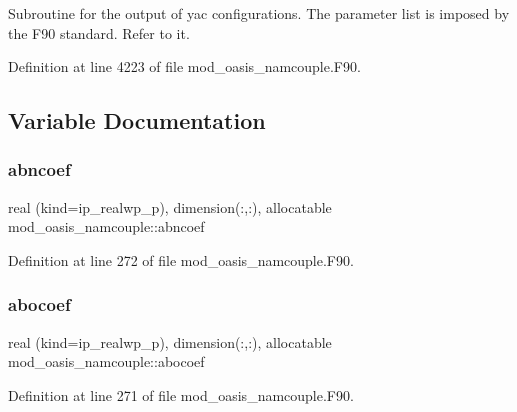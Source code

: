 Subroutine for the output of yac configurations. The parameter list is imposed by the F90 standard. Refer to it. 



Definition at line 4223 of file mod\+\_\+oasis\+\_\+namcouple.\+F90.



\subsection{Variable Documentation}
\mbox{\label{namespacemod__oasis__namcouple_a211c98282b89859bee6da0ef60f0d484}} 
\subsubsection{\texorpdfstring{abncoef}{abncoef}}
{\footnotesize\ttfamily real (kind=ip\+\_\+realwp\+\_\+p), dimension(\+:,\+:), allocatable mod\+\_\+oasis\+\_\+namcouple\+::abncoef\hspace{0.3cm}{\ttfamily [private]}}



Definition at line 272 of file mod\+\_\+oasis\+\_\+namcouple.\+F90.

\mbox{\label{namespacemod__oasis__namcouple_a1b3f80e8e19f950b806636caadeb704b}} 
\subsubsection{\texorpdfstring{abocoef}{abocoef}}
{\footnotesize\ttfamily real (kind=ip\+\_\+realwp\+\_\+p), dimension(\+:,\+:), allocatable mod\+\_\+oasis\+\_\+namcouple\+::abocoef\hspace{0.3cm}{\ttfamily [private]}}



Definition at line 271 of file mod\+\_\+oasis\+\_\+namcouple.\+F90.

\mbox{\label{namespacemod__oasis__namcouple_a115cdfe0e05679107363605a992c6386}} 
